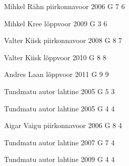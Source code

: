 \documentclass[11pt]{article}
\begin{document}
{Mihkel Rähn} %
{piirkonnavoor} %
{2006} %
{G 7} %
{6} %
{

\ifEngHint
\fi
}

{Mihkel Kree} %
{lõppvoor} %
{2009} %
{G 3} %
{6} %
{

\ifEngHint
\fi
}

{Valter Kiisk} %
{piirkonnavoor} %
{2008} %
{G 8} %
{7} %
{

\ifEngHint
\fi
}

{Valter Kiisk} %
{lõppvoor} %
{2010} %
{G 8} %
{8} %
{

\ifEngHint
\fi
}

{Andres Laan} %
{lõppvoor} %
{2011} %
{G 9} %
{9} %
{

\ifEngHint
\fi
}

{Tundmatu autor} %
{lahtine} %
{2005} %
{G 5} %
{3} %
{

\ifEngHint
\fi
}

{Tundmatu autor} %
{lahtine} %
{2005} %
{G 4} %
{4} %
{

\ifEngHint
\fi
}

{Aigar Vaigu} %
{piirkonnavoor} %
{2006} %
{G 8} %
{4} %
{

\ifEngHint
\fi
}

{Tundmatu autor} %
{lahtine} %
{2007} %
{G 7} %
{4} %
{

\ifEngHint
\fi
}

{Tundmatu autor} %
{lahtine} %
{2009} %
{G 4} %
{4} %
{

\ifEngHint
\fi
}
\end{document}
